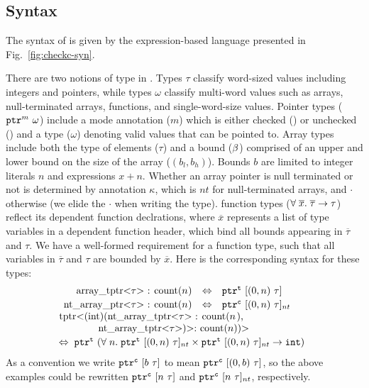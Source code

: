 \subsection{Syntax}\label{sec:syntax}

The syntax of \lang is given by the expression-based
language presented in Fig.~\ref{fig:checkc-syn}.

There are two notions of type in \lang.  Types $\tau$ classify
word-sized values including integers and pointers, while types
$\omega$ classify multi-word values such as arrays, null-terminated
arrays, functions, and single-word-size values.
%
Pointer types ($\mathtt{ptr}^{m}~{\omega}$) include a mode annotation ($m$)
which is either checked (\cmode) or unchecked (\umode) and a type
($\omega$) denoting valid values that can be pointed to. Array types include both the type of
elements ($\tau$) and a bound ($\beta$) comprised of an upper and
lower bound on the size of the array ($(b_l,b_h)$). Bounds $b$ are
limited to integer literals $n$ and expressions $x + n$.
Whether an array pointer is null terminated or not is determined by annotation
$\kappa$, which is $nt$ for null-terminated arrays, and $\cdot$
otherwise (we elide the $\cdot$ when writing the type).
\systemname function types ($\forall \;\overline{x}.\;{\overline{\tau}}\to\tau$)
reflect its dependent function declrations,
where $\overline{x}$ represents
a list of \tint type variables in a dependent function header,
which bind all bounds appearing in $\overline{\tau}$ and $\tau$.
We have a well-formed requirement for a function type,
such that all variables in $\overline{\tau}$ and $\tau$ are bounded by $\overline{x}$.
Here is the
corresponding \systemname syntax for these types:
\[\hspace*{-0.5em}
\begin{array}{l}
\begin{array}{rcl}
$\code{array_tptr<}$\tau$\code{> : count(}$n$\code{)}$
&\Leftrightarrow& \tarrayptr{0}{n}{\tau}{\tmode}
\\[0.2em]
$\code{nt_array_ptr<}$\tau$\code{> : count(}$n$\code{)}$
&\Leftrightarrow& \tntarrayptr{0}{n}{\tau}{\cmode}
\end{array}
\\[0.2em]
$\code{tptr<(int)(nt_array_tptr<}$\tau$\code{> : count(}$n$\code{),}$\\
\qquad\qquad$\code{nt_array_tptr<}$\tau$\code{>)>: count(}$n$\code{))>}$
\\[0.2em]
\Leftrightarrow\;\; $\tptr{(\tfun{n}{ \tntarrayptr{0}{n}{\tau}{\tmode} \times \tntarrayptr{0}{n}{\tau}{\tmode}}{\tint})}{\tmode}$
\end{array}
\]
As a convention we write $\mathtt{ptr}^{\texttt{c}}~{[{b}~{\tau}]}$ to mean
$\mathtt{ptr}^{\texttt{c}}~{[{({0},{b})}~{\tau}]}$, so the above examples could
be rewritten $\mathtt{ptr}^{\texttt{c}}~{[{n}~{\tau}]}$ and
$\mathtt{ptr}^{\texttt{c}}~{[{n}~{\tau}]_{nt}}$, respectively.

